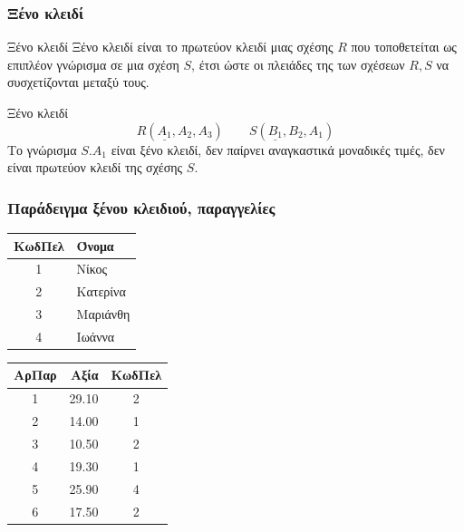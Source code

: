 \begin{frame}[t, fragile]
\frametitle{Ξένο κλειδί}
\begin{minipage}{0.94\textwidth}
  \begin{block}{Ξένο κλειδί}
    {\bb Ξένο κλειδί} είναι το πρωτεύον κλειδί μιας σχέσης $R$ που τοποθετείται ως επιπλέον γνώρισμα
    σε μια σχέση $S$, έτσι ώστε οι πλειάδες της των σχέσεων $R,S$ να συσχετίζονται μεταξύ τους.
  \end{block}
  \begin{exampleblock}{Ξένο κλειδί}
    \[
      R(\underline{A_1}, A_2, A_3) \quad \quad S(\underline{B_1}, B_2, A_1) 
    \]
    Το γνώρισμα $S.A_1$ είναι ξένο κλειδί, δεν παίρνει αναγκαστικά μοναδικές τιμές, δεν είναι πρωτεύον κλειδί
    της σχέσης $S$.
  \end{exampleblock} 
\end{minipage} 
\end{frame}


\begin{frame}[t, fragile]
\frametitle{Παράδειγμα ξένου κλειδιού, παραγγελίες}
\begin{minipage}{0.94\textwidth}
      \begin{tabular}{ c l } \hline
        {\bf ΚωδΠελ} & {\bf Όνομα}  \\ \hline 
        \rowcolor{blue!50}   1 & Νίκος     \\ 
        \rowcolor{red!50}    2 & Κατερίνα  \\
        \rowcolor{green!50}  3 & Μαριάνθη  \\ 
        \rowcolor{yellow!50} 4 & Ιωάννα    \\  \hline
      \end{tabular}
\hspace*{1cm}
      \begin{tabular}{ c r c  } \hline 
        {\bf ΑρΠαρ}  & {\bf Αξία} & {\bf ΚωδΠελ} \\ \hline 
        \rowcolor{red!50}    1  &  29.10  & 2  \\ 
        \rowcolor{blue!50}   2  &  14.00  & 1  \\ 
        \rowcolor{red!50}    3  &  10.50  & 2  \\ 
        \rowcolor{blue!50}   4  &  19.30  & 1  \\ 
        \rowcolor{yellow!50} 5  &  25.90  & 4  \\
        \rowcolor{red!50}    6  &  17.50  & 2  \\ \hline 
      \end{tabular}
\end{minipage} 
\end{frame}


